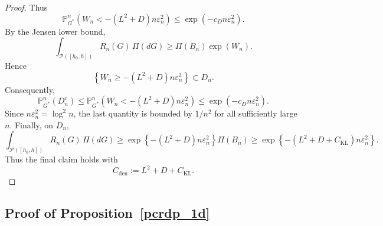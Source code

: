 \documentclass[twoside,12pt]{article}
\renewcommand{\P}{\mathds{P}}
\begin{document}
\begin{proof}
Thus
\begin{displaymath}
\P_{G^\ast}^n\!\left(W_n<-(L^2+D)n\varepsilon_n^2\right)\le\exp(-c_Dn\varepsilon_n^2).
\end{displaymath}
By the Jensen lower bound,
\begin{displaymath}
\int_{\mathcal{P}([h_{0},h])} R_n(G)\,\Pi(dG)\ge\Pi(B_n)\exp(W_n).
\end{displaymath}
Hence
\begin{displaymath}
\left\{W_n\ge -(L^2+D)n\varepsilon_n^2\right\}\subset D_n.
\end{displaymath}
Consequently,
\begin{displaymath}
\P_{G^\ast}^n(D_n^c)\le\P_{G^\ast}^n\!\left(W_n<-(L^2+D)n\varepsilon_n^2\right)\le\exp(-c_Dn\varepsilon_n^2).
\end{displaymath}
Since $n\varepsilon_n^2=\log^2 n$, the last quantity is bounded by $1/n^2$ for all sufficiently large $n$. Finally, on $D_n$,
\begin{displaymath}
\int_{\mathcal{P}([h_{0},h])} R_n(G)\,\Pi(dG)\ge\exp\!\left\{-(L^2+D)n\varepsilon_n^2\right\}\Pi(B_n)\ge\exp\!\left\{-(L^2+D+C_{\mathrm{KL}})n\varepsilon_n^2\right\}.
\end{displaymath}
Thus the final claim holds with
\begin{displaymath}
C_{\mathrm{den}}:=L^2+D+C_{\mathrm{KL}}.
\end{displaymath}
\end{proof}

\subsection{Proof of Proposition~\ref{pcrdp_1d}}
\end{document}
